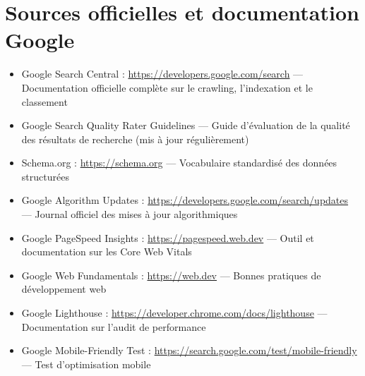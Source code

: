 \documentclass[12pt,a4paper,twoside]{report}
\begin{document}
\section*{Sources officielles et documentation Google}
\begin{itemize}
    \item Google Search Central : \url{https://developers.google.com/search} — Documentation officielle complète sur le crawling, l'indexation et le classement
    \item Google Search Quality Rater Guidelines — Guide d'évaluation de la qualité des résultats de recherche (mis à jour régulièrement)
    \item Schema.org : \url{https://schema.org} — Vocabulaire standardisé des données structurées
    \item Google Algorithm Updates : \url{https://developers.google.com/search/updates} — Journal officiel des mises à jour algorithmiques
    \item Google PageSpeed Insights : \url{https://pagespeed.web.dev} — Outil et documentation sur les Core Web Vitals
    \item Google Web Fundamentals : \url{https://web.dev} — Bonnes pratiques de développement web
    \item Google Lighthouse : \url{https://developer.chrome.com/docs/lighthouse} — Documentation sur l'audit de performance
    \item Google Mobile-Friendly Test : \url{https://search.google.com/test/mobile-friendly} — Test d'optimisation mobile
\end{itemize}
\end{document}

